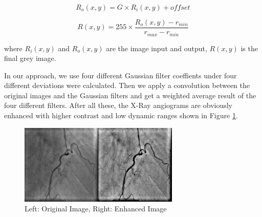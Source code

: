 \begin{equation}
R_{o}(x,y)=G \times R_{i}(x,y) + offset
\end{equation}

\begin{equation}
R(x,y)=255 \times \frac{R_{o}(x,y)-r_{min}}{r_{max}-r_{min}}
\end{equation}

where $R_{i}(x,y)$ and $R_{o}(x,y)$ are the image input and output,
$R(x,y)$ is the final grey image.

In our approach, we use four different Gaussian filter coeffients
under four different deviations were calculated. Then we apply a
convolution between the original images and the Gaussian filters and
get a weighted average result of the four different filters. After all
these, the X-Ray angiograms are obviously enhanced with higher
contrast and low dynamic ranges shown in Figure
\ref{fig:enhanced_image}.

\begin{figure}
  \centering
  \includegraphics[width=3.0in]{msr_cmp.png}
  \caption{Left: Original Image, Right: Enhanced Image}
  \label{fig:enhanced_image}
\end{figure}
